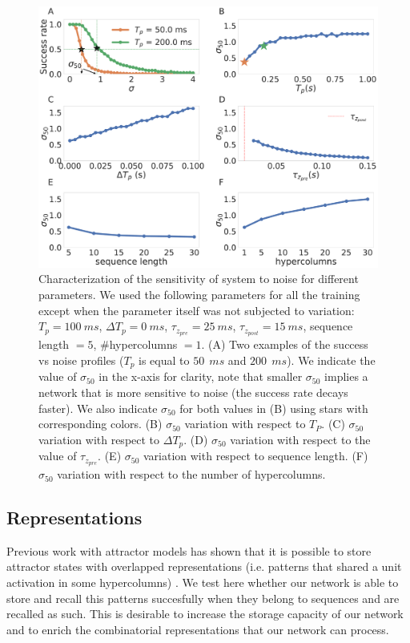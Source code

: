 \documentclass[10pt,a4paper]{article}
\begin{document}
\begin{figure}[H]
\centering
\includegraphics[scale=0.20]{noise_robustness.pdf}
\caption{Characterization of the sensitivity of system to noise for different parameters.  We used the following parameters for all the training except when the parameter itself was not subjected to variation: $T_p= 100 \: ms$, $\Delta T_p = 0 \: ms$, $\tau_{z_{pre}} = 25 \: ms$, $\tau_{z_{post}} = 15 \: ms$, sequence length $=5$, \#hypercolumns $ = 1$. (A) Two examples of the success vs noise profiles ($T_p$ is equal to $50 \:\: ms$ and $200 \:\: ms$). We indicate the value of $\sigma_{50}$ in the x-axis for clarity, note that smaller $\sigma_{50}$ implies a network that is more sensitive to noise (the success rate decays faster). We also indicate $\sigma_{50}$ for both values in (B) using stars with corresponding colors. (B) $\sigma_{50}$ variation with respect to $T_P$. (C) $\sigma_{50}$ variation with respect to $\Delta T_p$. (D) $\sigma_{50}$ variation with respect to the value of  $\tau_{z_{pre}}$. (E) $\sigma_{50}$ variation with respect to sequence length. (F) $\sigma_{50}$ variation with respect to the number of hypercolumns. }
\label{fig:noise_sensitivity}
\end{figure}


\subsection{Representations}

Previous work with attractor models has shown that it is possible to store attractor states with overlapped representations (i.e. patterns that shared a unit activation in some hypercolumns) \cite{meli2013modular} \cite{sandberg2002bayesian}. We test here whether our network is able to store and recall this patterns succesfully when they belong to sequences and are recalled as such. This is desirable to increase the storage capacity of our network and to enrich the combinatorial representations that our network can process.
\end{document}
